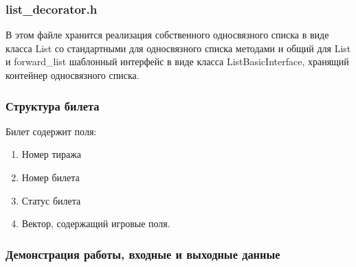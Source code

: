 \documentclass[a4paper,14pt]{article}
\begin{document}
\subsubsection{list\_decorator.h}
В этом файле хранится реализация собственного односвязного списка в виде класса List со стандартными для односвязного списка методами и общий для List и forward\_list шаблонный интерфейс в виде класса ListBasicInterface, хранящий контейнер односвязного списка.

\begin{center}
    \subsubsection{Структура билета}
\end{center}
Билет содержит поля:
\begin{enumerate} 
  \item Номер тиража
  \item Номер билета
  \item Статус билета
  \item Вектор, содержащий игровые поля.
\end{enumerate}

\clearpage
\begin{center}
    \subsubsection{Демонстрация работы, входные и выходные данные}
\end{center}
\end{document}
